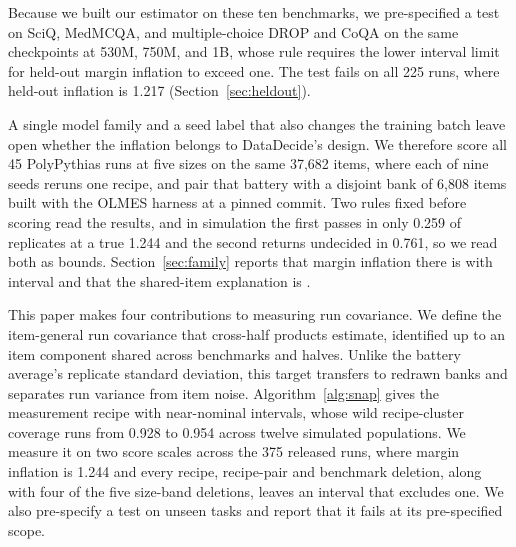 Because we built our estimator on these ten benchmarks, we pre-specified a test on SciQ, MedMCQA, and multiple-choice DROP and CoQA on the same checkpoints at 530M, 750M, and 1B, whose rule requires the lower interval limit for held-out margin inflation to exceed one. The test fails on all 225 runs, where held-out inflation is 1.217  (Section~\ref{sec:heldout}).

A single model family and a seed label that also changes the training batch leave open whether the inflation belongs to DataDecide's design. We therefore score all 45 PolyPythias runs at five sizes on the same 37,682 items, where each of nine seeds reruns one recipe, and pair that battery with a disjoint bank of 6,808 items built with the OLMES harness at a pinned commit. Two rules fixed before scoring read the results, and in simulation the first passes in only 0.259 of replicates at a true 1.244 and the second returns undecided in 0.761, so we read both as bounds. Section~\ref{sec:family} reports that margin inflation there is  with interval  and that the shared-item explanation is .

This paper makes four contributions to measuring run covariance. We define the item-general run covariance that cross-half products estimate, identified up to an item component shared across benchmarks and halves. Unlike the battery average's replicate standard deviation, this target transfers to redrawn banks and separates run variance from item noise. Algorithm~\ref{alg:snap} gives the measurement recipe with near-nominal intervals, whose wild recipe-cluster coverage runs from 0.928 to 0.954 across twelve simulated populations. We measure it on two score scales across the 375 released runs, where margin inflation is 1.244 and every recipe, recipe-pair and benchmark deletion, along with four of the five size-band deletions, leaves an interval that excludes one. We also pre-specify a test on unseen tasks and report that it fails at its pre-specified scope.
